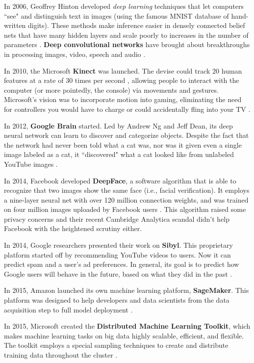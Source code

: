 In 2006, Geoffrey Hinton developed \textit{deep learning} techniques that let computers ``see" and distinguish text in images (using the famous MNIST database of hand-written digits). These methods make inference easier in densely connected belief nets that have many hidden layers and scale poorly to increases in the number of parameters \cite{hinton2006fast}. \textbf{Deep convolutional networks} have brought about breakthroughs in processing images, video, speech and audio \cite{marr2016short}. 

In 2010, the Microsoft \textbf{Kinect} was launched. The devise could track 20 human features at a rate of 30 times per second \cite{marr2016short}, allowing people to interact with the computer (or more pointedly, the console) via movements and gestures. Microsoft's vision was to incorporate motion into gaming, eliminating the need for controllers you would have to charge or could accidentally fling into your TV \cite{kinect2018}.

In 2012, \textbf{Google Brain} started. Led by Andrew Ng and Jeff Dean, its deep neural network can learn to discover and categorize objects. Despite the fact that the network had never been told what a cat was, nor was it given even a single image labeled as a cat, it ``discovered" what a cat looked like from unlabeled YouTube images \cite{dean2015using}. 

In 2014, Facebook developed \textbf{DeepFace}, a software algorithm that is able to recognize that two images show the same face (i.e., facial verification). It employs a nine-layer neural net with over 120 million connection weights, and was trained on four million images uploaded by Facebook users \cite{simonite2014software}. This algorithm raised some privacy concerns and their recent Cambridge Analytica scandal didn't help Facebook with the heightened scrutiny either. 

In 2014, Google researchers presented their work on \textbf{Sibyl}. This proprietary platform started off by recommending YouTube videos to users. Now it can predict spam and a user's ad preferences. In general, its goal is to predict how Google users will behave in the future, based on what they did in the past \cite{sibyl2014}.

In 2015, Amazon launched its own machine learning platform, \textbf{SageMaker}. This platform was designed to help developers and data scientists from the data acquisition step to full model deployment \cite{sagemaker2018}. 

In 2015, Microsoft created the \textbf{Distributed Machine Learning Toolkit}, which makes machine learning tasks on big data highly scalable, efficient, and flexible. The toolkit employs a special sampling techniques to create and distribute training data throughout the cluster \cite{microsoft2015dmlt}.

